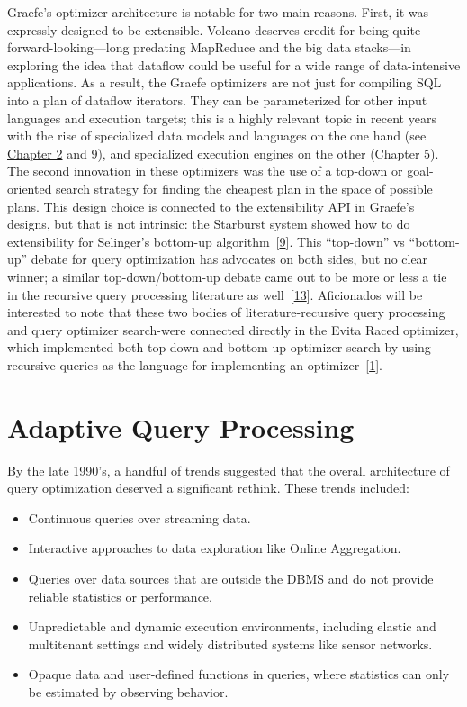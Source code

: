 \documentclass[b5paper,11pt,twoside,openright]{book}
\newcommand\Section[2]{
  \hypertarget{#1}{
    \section{#2}
  }
}
\begin{document}
Graefe's optimizer architecture is notable for two main reasons. First,
it was expressly designed to be extensible. Volcano deserves credit for
being quite forward-looking---long predating MapReduce and the big data
stacks---in exploring the idea that dataflow could be useful for a wide
range of data-intensive applications. As a result, the Graefe optimizers
are not just for compiling SQL into a plan of dataflow iterators. They
can be parameterized for other input languages and execution targets;
this is a highly relevant topic in recent years with the rise of
specialized data models and languages on the one hand (see
\hyperref[ch2-importantdbms]{Chapter 2} and 9), and specialized
execution engines on the other (Chapter 5). The second innovation in
these optimizers was the use of a top-down or goal-oriented search
strategy for finding the cheapest plan in the space of possible plans.
This design choice is connected to the extensibility API in Graefe's
designs, but that is not intrinsic: the Starburst system showed how to
do extensibility for Selinger's bottom-up
algorithm~{{[}\protect\hyperlink{ref-lohman1988grammar}{9}{]}}. This
``top-down'' vs ``bottom-up'' debate for query optimization has
advocates on both sides, but no clear winner; a similar
top-down/bottom-up debate came out to be more or less a tie in the
recursive query processing literature as
well~{{[}\protect\hyperlink{ref-ramakrishnan1991top}{13}{]}}.
Aficionados will be interested to note that these two bodies of
literature-recursive query processing and query optimizer search-were
connected directly in the Evita Raced optimizer, which implemented both
top-down and bottom-up optimizer search by using recursive queries as
the language for implementing an
optimizer~{{[}\protect\hyperlink{ref-condie2008evita}{1}{]}}.

\Section{adaptive-query-processing}{%
Adaptive Query Processing
}

By the late 1990's, a handful of trends suggested that the overall
architecture of query optimization deserved a significant rethink. These
trends included:

\begin{itemize}
  \item
  Continuous queries over streaming data.
  \item
  Interactive approaches to data exploration like Online Aggregation.
  \item
  Queries over data sources that are outside the DBMS and do not provide
  reliable statistics or performance.
  \item
  Unpredictable and dynamic execution environments, including elastic
  and multitenant settings and widely distributed systems like sensor
  networks.
  \item
  Opaque data and user-defined functions in queries, where statistics
  can only be estimated by observing behavior.
\end{itemize}
\end{document}

